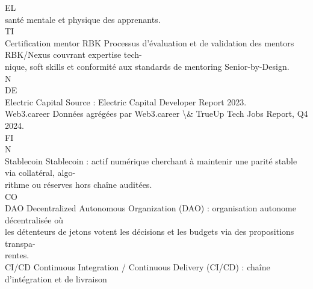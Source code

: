 \documentclass[12pt,landscape,a4paper]{article}
\begin{document}
\vspace{0.5em}
\vspace{0.5em}
\vspace{0.5em}
\vspace{0.5em}
EL\\
santé mentale et physique des apprenants.\\
\vspace{0.5em}
\vspace{0.5em}
\vspace{0.5em}
\vspace{0.5em}
TI\\
Certification mentor RBK                Processus d’évaluation et de validation des mentors RBK/Nexus couvrant expertise tech-\\
nique, soft skills et conformité aux standards de mentoring Senior-by-Design.\\
\vspace{0.5em}
\vspace{0.5em}
\vspace{0.5em}
\vspace{0.5em}
N\\
DE\\
Electric Capital                        Source : Electric Capital Developer Report 2023.\\
\vspace{0.5em}
Web3.career                             Données agrégées par Web3.career \textbackslash{}& TrueUp Tech Jobs Report, Q4 2024.\\
\vspace{0.5em}
\vspace{0.5em}
\vspace{0.5em}
\vspace{0.5em}
FI\\
N\\
Stablecoin                              Stablecoin : actif numérique cherchant à maintenir une parité stable via collatéral, algo-\\
rithme ou réserves hors chaîne auditées.\\
CO\\
DAO                                     Decentralized Autonomous Organization (DAO) : organisation autonome décentralisée où\\
les détenteurs de jetons votent les décisions et les budgets via des propositions transpa-\\
rentes.\\
\vspace{0.5em}
CI/CD                                   Continuous Integration / Continuous Delivery (CI/CD) : chaîne d’intégration et de livraison\\
\end{document}
